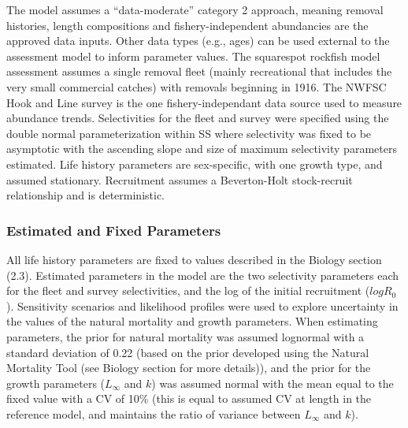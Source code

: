\documentclass[11pt,
  english,
  a4paper,
]{article}
\begin{document}

The model assumes a ``data-moderate'' category 2 approach, meaning removal histories, length compositions and fishery-independent abundancies are the approved data inputs. Other data types (e.g., ages) can be used external to the assessment model to inform parameter values. The squarespot rockfish model assessment assumes a single removal fleet (mainly recreational that includes the very small commercial catches) with removals beginning in 1916. The NWFSC Hook and Line survey is the one fishery-independant data source used to measure abundance trends. Selectivities for the fleet and survey were specified using the double normal parameterization within SS where selectivity was fixed to be asymptotic with the ascending slope and size of maximum selectivity parameters estimated. Life history parameters are sex-specific, with one growth type, and assumed stationary. Recruitment assumes a Beverton-Holt stock-recruit relationship and is deterministic.

\leavevmode\tagmcend\tagstructend\par


\hypertarget{estimated-and-fixed-parameters}{%
\subsubsection{Estimated and Fixed Parameters}\label{estimated-and-fixed-parameters}}

\leavevmode\tagmcend\tagstructend


All life history parameters are fixed to values described in the Biology section (2.3). Estimated parameters in the model are the two selectivity parameters each for the fleet and survey selectivities, and the log of the initial recruitment ({\(logR_0\)\leavevmode\tagmcend\tagstructend}). Sensitivity scenarios and likelihood profiles were used to explore uncertainty in the values of the natural mortality and growth parameters. When estimating parameters, the prior for natural mortality was assumed lognormal with a standard deviation of 0.22 (based on the prior developed using the Natural Mortality Tool (see Biology section for more details)), and the prior for the growth parameters ({\(L_{\infty}\)\leavevmode\tagmcend\tagstructend} and {\(k\)\leavevmode\tagmcend\tagstructend}) was assumed normal with the mean equal to the fixed value with a CV of 10\% (this is equal to assumed CV at length in the reference model, and maintains the ratio of variance between {\(L_{\infty}\)\leavevmode\tagmcend\tagstructend} and {\(k\)\leavevmode\tagmcend\tagstructend}).
\end{document}
